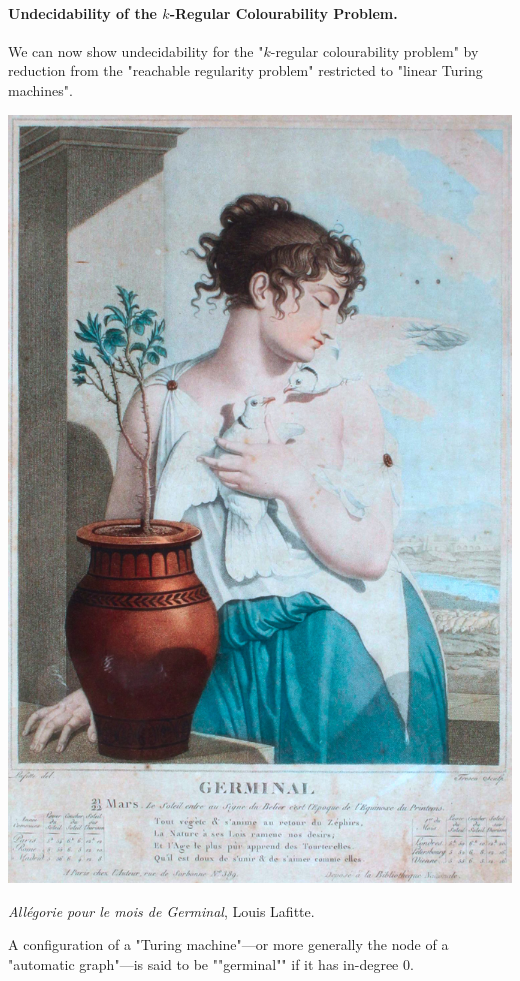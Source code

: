 \paragraph*{Undecidability of the $k$-Regular Colourability Problem.}
We can now show undecidability for the "$k$-regular colourability problem" by reduction from the "reachable regularity problem" restricted to "linear Turing machines".

\begin{marginfigure}
    \centering
    \includegraphics[width=\linewidth]{fig/germinal.jpg}
    \caption{\emph{Allégorie pour le mois de Germinal}, Louis Lafitte.}
\end{marginfigure}

A configuration of a "Turing machine"---or more generally the node of a "automatic graph"---is said 
to be \AP""germinal"" if it has in-degree 0.


